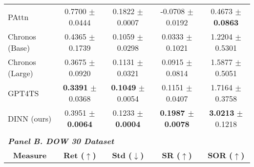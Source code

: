 {\begin{tabular}{lcccc}
PAttn                                & 0.7700 $\pm$ 0.0444                                                      & {\color[HTML]{000000} 0.1822 $\pm$ 0.0007}                      & -0.0708 $\pm$ 0.0192                                & 0.4673 $\pm$ \textbf{\color[HTML]{00009B} 0.0863}            \\
Chronos (Base)                       & 0.4365 $\pm$ 0.1739                                                      & 0.1059 $\pm$ 0.0298                                             & 0.0333 $\pm$ 0.1021                                 & 1.2204 $\pm$ 0.5301                                 \\
Chronos (Large)                      & 0.3675 $\pm$ 0.0920                                                      & 0.1131 $\pm$ 0.0321                                             & 0.0915 $\pm$ 0.0814                                 & 1.5877 $\pm$ 0.5051                                 \\
GPT4TS                               & \textbf{0.3391} $\pm$ 0.0368                                             & \textbf{0.1049} $\pm$ 0.0054                                    & 0.1151 $\pm$ 0.0407                                 & 1.7164 $\pm$ 0.3758                                 \\
DINN (ours)                          & 0.3951 $\pm$ \textbf{\color[HTML]{00009B} 0.0064}                               & {\color[HTML]{000000} 0.1233 $\pm$ \textbf{\color[HTML]{00009B} 0.0004}} & \textbf{0.1987 $\pm$ \color[HTML]{00009B} 0.0078}   & \textbf{3.0213} $\pm$ 0.1218                        \\ \hline
\multicolumn{5}{l}{}                                                                                                                                                                                                                                                                  \\ \hline
\multicolumn{5}{l}{\textit{\textbf{Panel B. DOW 30 Dataset}}}                                                                                                                                                                                                                         \\ 
\multicolumn{1}{c}{\textbf{Measure}} & \textbf{Ret ($\uparrow$)}                                              & \textbf{Std ($\downarrow$)}                                   & \textbf{SR ($\uparrow$)}                          & \textbf{SOR ($\uparrow$)}                         \\ \hline

\end{tabular}}
